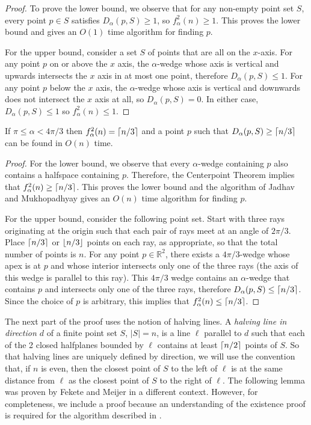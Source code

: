 \documentclass[lotsofwhite]{patmorin}
\begin{document}
\begin{proof}
To prove the lower bound, we observe that for any non-empty
point set $S$, every point $p\in S$ satisfies $D_\alpha(p,S)\ge 1$, so
$f^2_\alpha(n) \ge 1$. This proves the lower bound and gives an $O(1)$
time algorithm for finding $p$. 

For the upper bound, consider a set $S$ of points that are all
on the $x$-axis.  For any point $p$ on or above the $x$ axis, the
$\alpha$-wedge whose axis is vertical and upwards intersects the $x$
axis in at most one point, therefore $D_\alpha(p,S) \le 1$.  For any
point $p$ below the $x$ axis, the $\alpha$-wedge whose axis is
vertical and downwards does not intersect the $x$ axis at all, so
$D_\alpha(p,S)=0$.  In either case, $D_\alpha(p,S)\le 1$ so $f^2_\alpha(n)
\le 1$.
\end{proof}

\begin{lem}
If $\pi\le \alpha < 4\pi/3$ then $f^2_\alpha(n) = \left\lceil n/3 \right\rceil$ and a
point $p$ such that $D_\alpha(p,S)\ge \left\lceil n/3 \right\rceil$ can be found in $O(n)$ time.
\end{lem}

\begin{proof} 
For the lower bound, we observe that every $\alpha$-wedge containing
$p$ also contains a halfspace containing $p$.  Therefore, the
Centerpoint Theorem implies that $f^2_\alpha(n) \ge \left\lceil n/3 \right\rceil$.  This
proves the lower bound and the algorithm of Jadhav and Mukhopadhyay
\cite{jm94} gives an $O(n)$ time algorithm for finding $p$.

For the upper bound, consider the following point set.  Start with
three rays originating at the origin such that each pair of rays meet at an
angle of $2\pi/3$.  Place $\left\lceil n/3 \right\rceil$ or $\left\lfloor n/3 \right\rfloor$ points on each
ray, as appropriate, so that the total number of points is $n$.  For
any point $p\in\mathbb{R}^2$, there exists a $4\pi/3$-wedge whose apex
is at $p$ and whose interior intersects only one of the three rays
(the axis of this wedge is parallel to this ray). This $4\pi/3$ wedge
contains an $\alpha$-wedge that contains $p$ and intersects only one
of the three rays, therefore $D_\alpha(p,S)\le \left\lceil n/3 \right\rceil$.  Since the
choice of $p$ is arbitrary, this implies that $f^2_\alpha(n) \le
\left\lceil n/3 \right\rceil$.  
\end{proof}

The next part of the proof uses the notion of halving lines.  A
\emph{halving line in direction $d$} of a finite point set $S$,
$|S|=n$, is a line $\ell$ parallel to $d$ such that each of the 2
closed halfplanes bounded by $\ell$ contains at least
$\left\lceil n/2 \right\rceil$ points of $S$.  So that halving lines are uniquely
defined by direction, we will use the convention that, if $n$ is even,
then the closest point of $S$ to the left of $\ell$ is at the same
distance from $\ell$ as the closest point of $S$ to the right of
$\ell$.  The following lemma was proven by Fekete and Meijer
\cite[Lemma~2]{fm00} in a different context.  However, for
completeness, we include a proof because an understanding of the
existence proof is required for the algorithm described in
.
\end{document}
